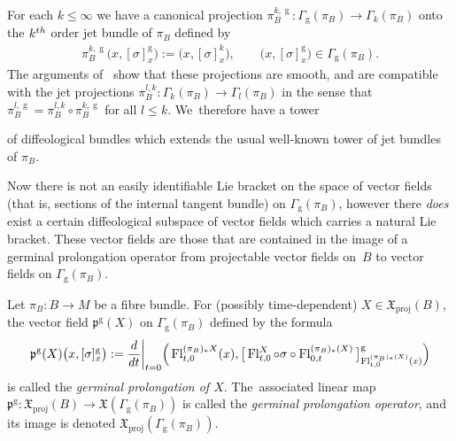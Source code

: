 \documentclass[11pt]{article}
\numberwithin{equation}{section}
\numberwithin{equation}{section}
\def\g{\operatorname{g}}
\def\proj{\operatorname{proj}}
\def\Fl{\operatorname{Fl}}
\def\XF{{\mathfrak{X}}}
\def\pf{{\mathfrak{p}}}
\begin{document}
For each $k\leq\infty$ we have a canonical projection $\pi_{B}^{k,\g}\colon \Gamma_{\g}(\pi_{B})\rightarrow \Gamma_{k}(\pi_{B})$ onto the $k^{\rm th}$ order jet bundle of $\pi_{B}$ defined by
\begin{gather*}
\pi_{B}^{k,\g}\big(x,[\sigma]^{\g}_{x}\big):=\big(x,[\sigma]^{k}_{x}\big),\qquad \big(x,[\sigma]^{\g}_{x}\big)\in\Gamma_{\g}(\pi_{B}).
\end{gather*}
The arguments of~\cite[Proposition~5.14]{mac3} show that these projections are smooth, and are compatible with the jet projections $\pi_{B}^{l,k}\colon \Gamma_{k}(\pi_{B})\rightarrow \Gamma_{l}(\pi_{B})$ in the sense that $\pi_{B}^{l,\g} = \pi_{B}^{l,k}\circ\pi_{B}^{k,\g}$ for all $l\leq k$. We~therefore have a tower
\begin{center}
\end{center}
of diffeological bundles which extends the usual well-known tower of jet bundles of $\pi_{B}$.

Now there is not an easily identifiable Lie bracket on the space of vector fields (that is, sections of the internal tangent bundle) on $\Gamma_{\g}(\pi_{B})$, however there \textit{does} exist a certain diffeological subspace of vector fields which carries a natural Lie bracket. These vector fields are those that are contained in the image of a germinal prolongation operator from projectable vector fields on~$B$ to vector fields on $\Gamma_{\g}(\pi_{B})$.

\begin{Definition}
Let $\pi_{B}\colon B\rightarrow M$ be a fibre bundle. For (possibly time-dependent) $X\in\XF_{\proj}(B)$, the vector field $\pf^{\g}(X)$ on $\Gamma_{\g}(\pi_{B})$ defined by the formula
\begin{gather*}
\pf^{\g}(X)\big(x,[\sigma]^{\g}_{x}\big):=\frac{\rm d}{{\rm d}t}\bigg|_{t=0} \Big(\Fl^{(\pi_{B})_{*}X}_{t,0}(x),\big[\Fl^{X}_{t,0}\circ\sigma \circ\Fl^{(\pi_{B})_{*}(X)}_{0,t}\big]^{\g}_{\Fl^{(\pi_{B})_{*}(X)}_{t,0}(x)}\Big)
\end{gather*}
is called the \textit{germinal prolongation of $X$}. The~associated linear map $\pf^{\g}\colon \XF_{\proj}(B)\rightarrow \XF(\Gamma_{\g}(\pi_{B}))$ is called the \textit{germinal prolongation operator}, and its image is denoted $\XF_{\proj}(\Gamma_{\g}(\pi_{B}))$.
\end{Definition}
\end{document}
